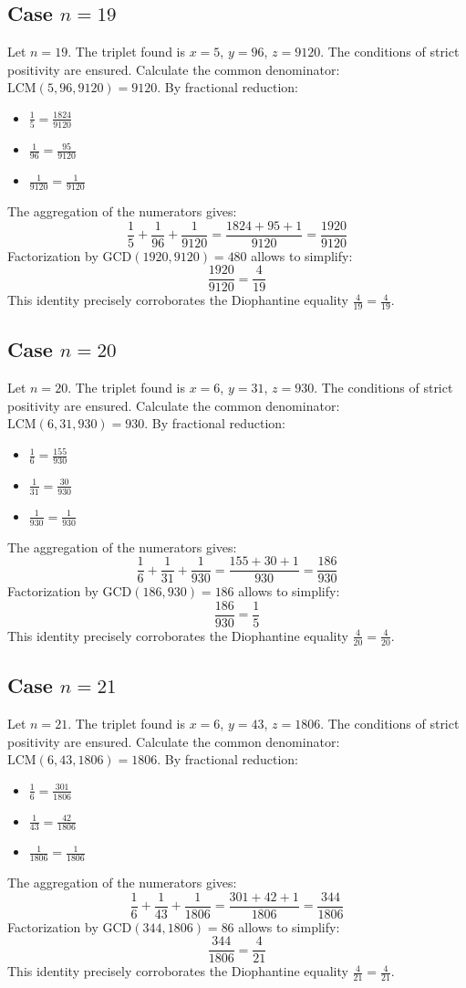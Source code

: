 \documentclass[11pt,a4paper]{article}
\begin{document}
\subsection{Case $n = 19$}
Let $n = 19$. The triplet found is $x = 5$, $y = 96$, $z = 9120$.
The conditions of strict positivity are ensured.
Calculate the common denominator: $\text{LCM}(5, 96, 9120) = 9120$.
By fractional reduction:
\begin{itemize}
    \item $\frac{1}{5} = \frac{1824}{9120}$
    \item $\frac{1}{96} = \frac{95}{9120}$
    \item $\frac{1}{9120} = \frac{1}{9120}$
\end{itemize}
The aggregation of the numerators gives:
$$ \frac{1}{5} + \frac{1}{96} + \frac{1}{9120} = \frac{1824 + 95 + 1}{9120} = \frac{1920}{9120} $$
Factorization by $\text{GCD}(1920, 9120) = 480$ allows to simplify:
$$ \frac{1920}{9120} = \frac{4}{19} $$
This identity precisely corroborates the Diophantine equality $\frac{4}{19} = \frac{4}{19}$.

\subsection{Case $n = 20$}
Let $n = 20$. The triplet found is $x = 6$, $y = 31$, $z = 930$.
The conditions of strict positivity are ensured.
Calculate the common denominator: $\text{LCM}(6, 31, 930) = 930$.
By fractional reduction:
\begin{itemize}
    \item $\frac{1}{6} = \frac{155}{930}$
    \item $\frac{1}{31} = \frac{30}{930}$
    \item $\frac{1}{930} = \frac{1}{930}$
\end{itemize}
The aggregation of the numerators gives:
$$ \frac{1}{6} + \frac{1}{31} + \frac{1}{930} = \frac{155 + 30 + 1}{930} = \frac{186}{930} $$
Factorization by $\text{GCD}(186, 930) = 186$ allows to simplify:
$$ \frac{186}{930} = \frac{1}{5} $$
This identity precisely corroborates the Diophantine equality $\frac{4}{20} = \frac{4}{20}$.

\subsection{Case $n = 21$}
Let $n = 21$. The triplet found is $x = 6$, $y = 43$, $z = 1806$.
The conditions of strict positivity are ensured.
Calculate the common denominator: $\text{LCM}(6, 43, 1806) = 1806$.
By fractional reduction:
\begin{itemize}
    \item $\frac{1}{6} = \frac{301}{1806}$
    \item $\frac{1}{43} = \frac{42}{1806}$
    \item $\frac{1}{1806} = \frac{1}{1806}$
\end{itemize}
The aggregation of the numerators gives:
$$ \frac{1}{6} + \frac{1}{43} + \frac{1}{1806} = \frac{301 + 42 + 1}{1806} = \frac{344}{1806} $$
Factorization by $\text{GCD}(344, 1806) = 86$ allows to simplify:
$$ \frac{344}{1806} = \frac{4}{21} $$
This identity precisely corroborates the Diophantine equality $\frac{4}{21} = \frac{4}{21}$.
\end{document}
